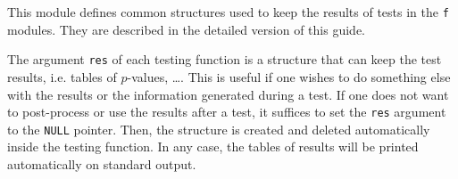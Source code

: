 
This module defines common structures used to keep the results of tests
in the {\tt f} modules. They are described in the detailed version of
this guide.


The argument {\tt res} of each testing function is a structure 
that can keep the test results, i.e. tables of $p$-values, \ldots.
This is useful if one wishes to do something else with the
results or the information generated during a test. 
If one does not want to post-process or use the results after a test,
it suffices to set the {\tt res} argument to the {\tt NULL} pointer.
Then, the structure is created and deleted automatically inside the 
testing function. In any case, the tables of results will be printed
automatically on standard output.
